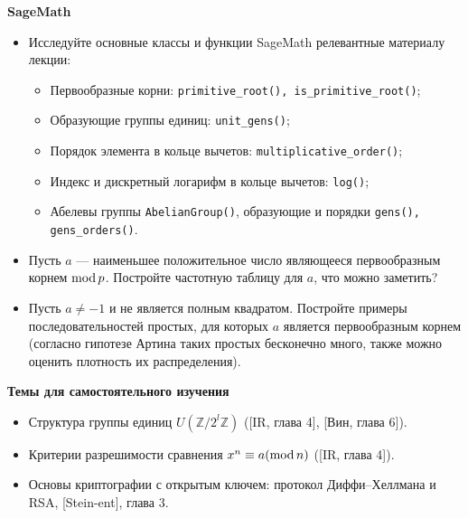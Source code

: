 \noindent\textbf{SageMath}
\begin{itemize}[topsep=0pt]

    \item Исследуйте основные классы и функции SageMath релевантные материалу лекции:
    \begin{itemize}[noitemsep,topsep=0pt]
        \item Первообразные корни: \texttt{primitive\_root(), is\_primitive\_root()};
        \item Образующие группы единиц: \texttt{unit\_gens()};
        \item Порядок элемента в кольце вычетов: \texttt{multiplicative\_order()};
        \item Индекс и дискретный логарифм в кольце вычетов: \texttt{log()};
        \item Абелевы группы \texttt{AbelianGroup()}, образующие и порядки \texttt{gens(), gens\_orders()}.
    
    \end{itemize}

    \item Пусть $a$ --- наименьшее положительное число являющееся первообразным корнем $\operatorname{mod} p$. Постройте частотную таблицу для $a$, что можно заметить?
    \item Пусть $a\neq -1$ и не является полным квадратом. Постройте примеры последовательностей простых, для которых $a$ является первообразным корнем (согласно гипотезе Артина таких простых бесконечно много, также можно оценить плотность их распределения).
    
\end{itemize}

\noindent\textbf{Темы для самостоятельного изучения}
\begin{itemize}[topsep=0pt]
    \item Структура группы единиц $U(\mathbb{Z}/2^l\mathbb{Z})$ ([IR, глава 4], [Вин, глава 6]).
    \item Критерии разрешимости сравнения $x^n\equiv a (\operatorname{mod} n)$ ([IR, глава 4]).
    \item Основы криптографии с открытым ключем: протокол Диффи--Хеллмана и RSA, [Stein-ent], глава 3.
\end{itemize}

